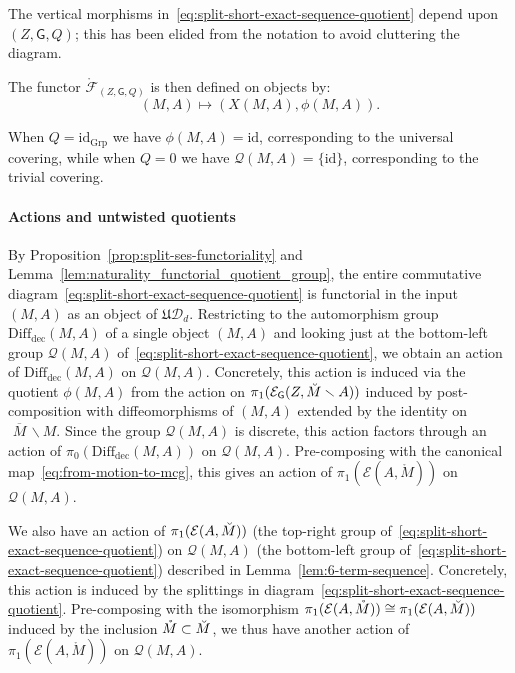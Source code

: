 \documentclass[AHL,Unicode,published]{cedram}
\newcommand{\id}{\mathrm{id}}
\newcommand{\Int}{\mathring}
\newcommand{\groups}{\ensuremath{\mathrm{Grp}}}
\newcommand{\rdec}{\mathrm{dec}}
\newcommand{\mbar}{\ensuremath{{\,\,\overline{\!\! M\!}\,}}}
\newcommand{\fU}{\ensuremath{\mathfrak{U}}}
\newcommand{\sG}{\mathsf{G}}
\newcommand{\cD}{\mathcal{D}}
\newcommand{\cE}{\mathcal{E}}
\newcommand{\cF}{\mathcal{F}}
\newcommand{\cQ}{\mathcal{Q}}
\newcommand{\diffdec}{\ensuremath{\mathrm{Diff}_{\rdec}}}
\begin{document}
The vertical morphisms in~\eqref{eq:split-short-exact-sequence-quotient} depend upon $(Z,\sG,Q)$; this has been elided from the notation to avoid cluttering the diagram.

The functor $\Int{\cF}_{(Z,\sG,Q)}$ is then defined on objects by:
\begin{equation}\label{eq:def_Int(F)_objects}
(M,A) \longmapsto (X(M,A),\phi(M,A)).
\end{equation}

\begin{exam}\label{eg:trivial_universal_covers}
When $Q = \id_{\groups}$ we have $\phi(M,A) = \id$, corresponding to the universal covering, while when $Q = 0$ we have $\cQ(M,A) = \{\id\}$, corresponding to the trivial covering.
\end{exam}


\paragraph*{Actions and untwisted quotients}
By Proposition~\ref{prop:split-ses-functoriality} and Lemma~\ref{lem:naturality_functorial_quotient_group}, the entire commutative diagram~\eqref{eq:split-short-exact-sequence-quotient} is functorial in the input $(M,A)$ as an object of $\fU\cD_{d}$. Restricting to the automorphism group $\diffdec(M,A)$ of a single object $(M,A)$ and looking just at the bottom-left group $\cQ(M,A)$ of~\eqref{eq:split-short-exact-sequence-quotient}, we obtain an action of $\diffdec(M,A)$ on $\cQ(M,A)$. Concretely, this action is induced via the quotient $\phi(M,A)$ from the action on $\pi_{1}(\cE_{\sG}(Z,\Breve{M}\smallsetminus A))$ induced by post-composition with diffeomorphisms of $(M,A)$ extended by the identity on $\mbar \smallsetminus M$. Since the group $\cQ(M,A)$ is discrete, this action factors through an action of $\pi_{0}(\diffdec(M,A))$ on $\cQ(M,A)$. Pre-composing with the canonical map~\eqref{eq:from-motion-to-mcg}, this gives an action of $\pi_{1}(\cE(A,\Int{M}))$ on $\cQ(M,A)$.

We also have an action of $\pi_{1}(\cE(A,\Breve{M}))$ (the top-right group of~\eqref{eq:split-short-exact-sequence-quotient}) on $\cQ(M,A)$ (the bottom-left group of~\eqref{eq:split-short-exact-sequence-quotient}) described in Lemma~\ref{lem:6-term-sequence}. Concretely, this action is induced by the splittings in diagram~\eqref{eq:split-short-exact-sequence-quotient}. Pre-composing with the isomorphism $\pi_{1}(\cE(A,\Int{M})) \cong \pi_{1}(\cE(A,\Breve{M}))$ induced by the inclusion $\Int{M} \subset \Breve{M}$, we thus have another action of $\pi_{1}(\cE(A,\Int{M}))$ on $\cQ(M,A)$.
\end{document}

